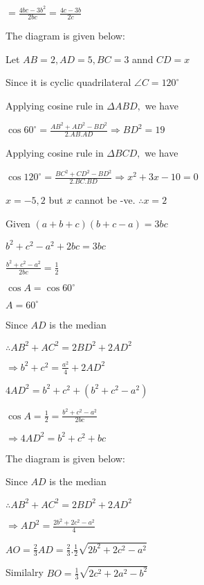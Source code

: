   $= \frac{4bc - 3b^2}{2bc} =\frac{4c - 3b}{2c}$

\item The diagram is given below:

  \startplacefigure
    \externalfigure[18_12.pdf]
  \stopplacefigure

  Let $AB = 2, AD = 5, BC = 3$ annd $CD=x$

  Since it is cyclic quadrilateral $\angle C = 120^\circ$

  Applying cosine rule in $\Delta ABD,$ we have

  $\cos 60^\circ = \frac{AB^2 + AD^2 - BD^2}{2.AB.AD} \Rightarrow BD^2 = 19$

  Applying cosine rule in $\Delta BCD,$ we have

  $\cos 120^\circ = \frac{BC^2 + CD^2 - BD^2}{2.BC.BD} \Rightarrow x^2 + 3x -10 = 0$

  $x = -5, 2$ but $x$ cannot be -ve. $\therefore x = 2$

\item Given $(a + b + c)(b + c - a) = 3bc$

  $b^2 + c^2 - a^2 + 2bc = 3bc$

  $\frac{b^2 + c^2 - a^2}{2bc} = \frac{1}{2}$

  $\cos A = \cos 60^\circ$

  $A = 60^\circ$

\item Since $AD$ is the median

  $\therefore AB^2 + AC^2 = 2BD^2 + 2AD^2$

  $\Rightarrow b^2 + c^2 = \frac{a^2}{4} + 2AD^2$

  $4AD^2 = b^2 + c^2 + (b^2 + c^2 - a^2)$

  $\cos A = \frac{1}{2} = \frac{b^2 + c^2 - a^2}{2bc}$

  $\Rightarrow 4AD^2 = b^2 + c^2 + bc$

\item The diagram is given below:

  \startplacefigure
    \externalfigure[18_13.pdf]
  \stopplacefigure

  Since $AD$ is the median

  $\therefore AB^2 + AC^2 = 2BD^2 + 2AD^2$

  $\Rightarrow AD^2 = \frac{2b^2 + 2c^2 - a^2}{4}$

  $AO = \frac{2}{3}AD = \frac{2}{3}.\frac{1}{2}\sqrt{2b^2 + 2c^2 - a^2}$

  Similalry $BO = \frac{1}{3}\sqrt{2c^2 + 2a^2 - b^2}$

